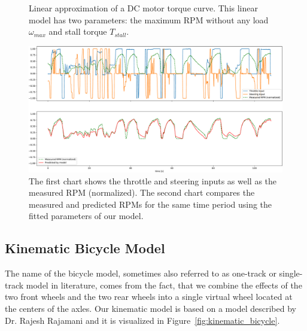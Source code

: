 \begin{figure}
	\centering
	
	
	\caption{Linear approximation of a DC motor torque curve. This linear model has two parameters: the maximum RPM without any load $\omega_{max}$ and stall torque $T_{stall}$.}
	\label{fig:torque_rpm_curve}
\end{figure}

\begin{figure}
	\centering
	\includegraphics[width=\textwidth]{../img/fit_8000}
	\caption{The first chart shows the throttle and steering inputs as well as the measured RPM (normalized). The second chart compares the measured and predicted RPMs for the same time period using the fitted parameters of our model.}
	\label{fig:motor_rpm_model}
\end{figure}

\subsection{Kinematic Bicycle Model}

The name of the bicycle model, sometimes also referred to as one-track or single-track model in literature, comes from the fact, that we combine the effects of the two front wheels and the two rear wheels into a single virtual wheel located at the centers of the axles. Our kinematic model is based on a model described by Dr. Rajesh Rajamani \cite[Chapter~2]{rajamani} and it is visualized in Figure~\ref{fig:kinematic_bicycle}.

